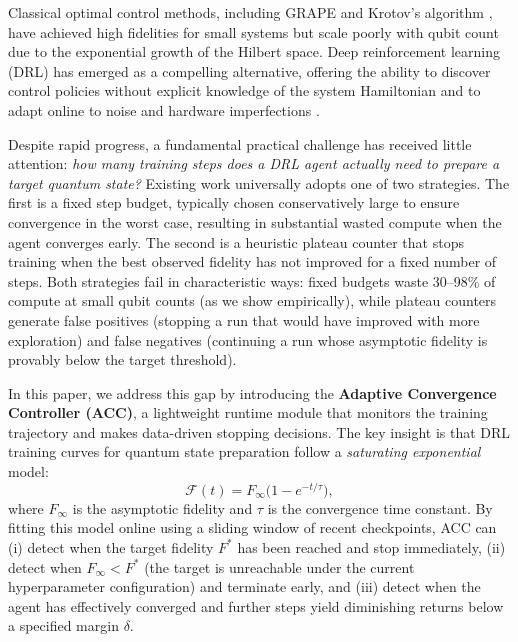 \documentclass[twocolumn,superscriptaddress]{quantumarticle}
\begin{document}
Classical optimal control methods, including GRAPE \cite{khaneja2005optimal} and
Krotov's algorithm \cite{sklarz2002loading}, have achieved high fidelities for small
systems but scale poorly with qubit count due to the exponential growth of the Hilbert
space. Deep reinforcement learning (DRL) has emerged as a compelling alternative, offering
the ability to discover control policies without explicit knowledge of the system Hamiltonian
and to adapt online to noise and hardware imperfections
\cite{bukov2018reinforcement,zhang2019does,niu2019universal}.

Despite rapid progress, a fundamental practical challenge has received little attention:
\emph{how many training steps does a DRL agent actually need to prepare a target quantum
state?} Existing work universally adopts one of two strategies. The first is a fixed step
budget, typically chosen conservatively large to ensure convergence in the worst case,
resulting in substantial wasted compute when the agent converges early. The second is a
heuristic plateau counter that stops training when the best observed fidelity has not
improved for a fixed number of steps. Both strategies fail in characteristic ways:
fixed budgets waste 30--98\% of compute at small qubit counts (as we show empirically),
while plateau counters generate false positives (stopping a run that would have improved
with more exploration) and false negatives (continuing a run whose asymptotic fidelity
is provably below the target threshold).

In this paper, we address this gap by introducing the \textbf{Adaptive Convergence
Controller (ACC)}, a lightweight runtime module that monitors the training trajectory
and makes data-driven stopping decisions. The key insight is that DRL training curves
for quantum state preparation follow a \emph{saturating exponential} model:
\begin{equation}
  \mathcal{F}(t) = F_\infty \bigl(1 - e^{-t/\tau}\bigr),
  \label{eq:sat_exp}
\end{equation}
where $F_\infty$ is the asymptotic fidelity and $\tau$ is the convergence time constant.
By fitting this model online using a sliding window of recent checkpoints, ACC can
(i) detect when the target fidelity $F^*$ has been reached and stop immediately,
(ii) detect when $F_\infty < F^*$ (the target is unreachable under the current
hyperparameter configuration) and terminate early, and (iii) detect when the agent
has effectively converged and further steps yield diminishing returns below a
specified margin $\delta$.
\end{document}
